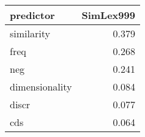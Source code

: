 \begin{tabular}{lr}
\toprule
      predictor &  SimLex999 \\
\midrule
     similarity &      0.379 \\
           freq &      0.268 \\
            neg &      0.241 \\
 dimensionality &      0.084 \\
          discr &      0.077 \\
            cds &      0.064 \\
\bottomrule
\end{tabular}
